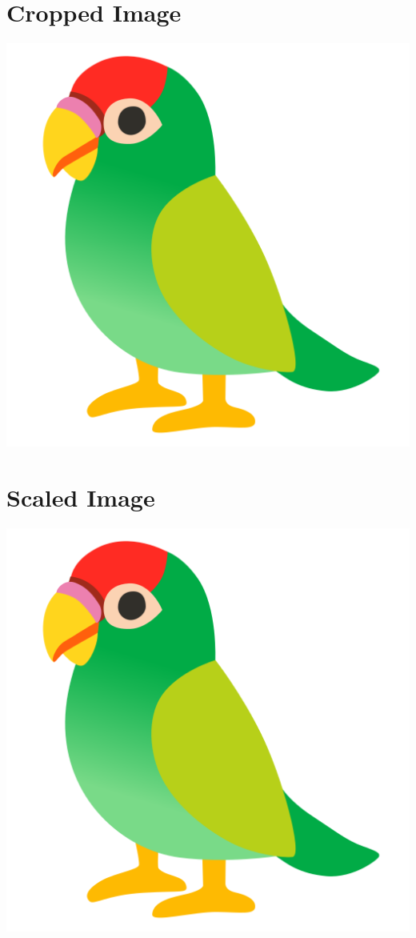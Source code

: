 \documentclass{article}
\begin{document}
    \section{Cropped Image} 
    \includegraphics[clip=true, trim=1mm 1mm 1mm 1mm]{images/parrot.png}

    \section{Scaled Image}
    \includegraphics[scale=2]{images/parrot.png}
\end{document}
